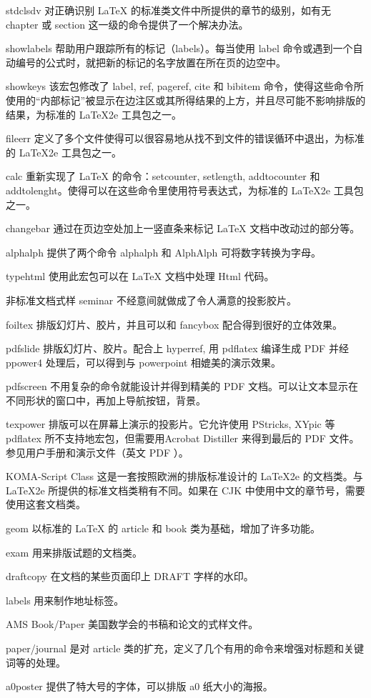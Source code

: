 stdclsdv
对正确识别 LaTeX 的标准类文件中所提供的章节的级别，如有无 chapter 或 section 这一级的命令提供了一个解决办法。
 
showlabels
帮助用户跟踪所有的标记（labels）。每当使用 label 命令或遇到一个自动编号的公式时，就把新的标记的名字放置在所在页的边空中。
 
showkeys
该宏包修改了 label, ref, pageref, cite 和 bibitem 命令，使得这些命令所使用的“内部标记”被显示在边注区或其所得结果的上方，并且尽可能不影响排版的结果，为标准的 LaTeX2e 工具包之一。
 
fileerr
定义了多个文件使得可以很容易地从找不到文件的错误循环中退出，为标准的 LaTeX2e 工具包之一。
 
calc
重新实现了 LaTeX 的命令：setcounter, setlength, addtocounter 和 addtolenght。使得可以在这些命令里使用符号表达式，为标准的 LaTeX2e 工具包之一。
 
changebar
通过在页边空处加上一竖直条来标记 LaTeX 文档中改动过的部分等。
 
alphalph
提供了两个命令 alphalph 和 AlphAlph 可将数字转换为字母。
 
typehtml
使用此宏包可以在 LaTeX 文档中处理 Html 代码。
 
非标准文档式样
seminar
不经意间就做成了令人满意的投影胶片。
 
foiltex
排版幻灯片、胶片，并且可以和 fancybox 配合得到很好的立体效果。
 
pdfslide
排版幻灯片、胶片。配合上 hyperref, 用 pdflatex 编译生成 PDF 并经 ppower4 处理后，可以得到与 powerpoint 相媲美的演示效果。
 
pdfscreen
不用复杂的命令就能设计并得到精美的 PDF 文档。可以让文本显示在不同形状的窗口中，再加上导航按钮，背景。
 
texpower
排版可以在屏幕上演示的投影片。它允许使用 PStricks, XYpic 等pdflatex 所不支持地宏包，但需要用Acrobat Distiller 来得到最后的 PDF 文件。参见用户手册和演示文件（英文 PDF ）。
 
KOMA-Script Class
这是一套按照欧洲的排版标准设计的 LaTeX2e 的文档类。与 LaTeX2e 所提供的标准文档类稍有不同。如果在 CJK 中使用中文的章节号，需要使用这套文档类。
 
geom
以标准的 LaTeX 的 article 和 book 类为基础，增加了许多功能。
 

exam
用来排版试题的文档类。
 
draftcopy
在文档的某些页面印上 DRAFT 字样的水印。
 
labels
用来制作地址标签。
 
AMS Book/Paper
美国数学会的书稿和论文的式样文件。
 
paper/journal
是对 article 类的扩充，定义了几个有用的命令来增强对标题和关键词等的处理。
 
a0poster
提供了特大号的字体，可以排版 a0 纸大小的海报。